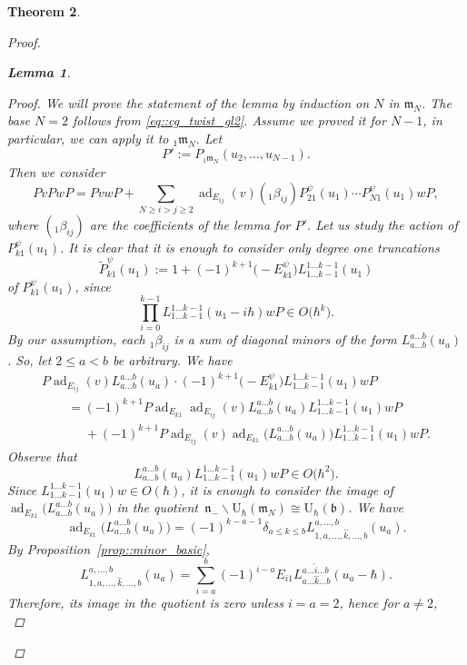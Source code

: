 \documentclass[10pt,a4paper]{article}
\numberwithin{equation}{section}
\newtheorem{Theorem}{Theorem}[section]
\newtheorem{Lemma}[Theorem]{Lemma}
\newcommand{\U}{\mathrm{U}_{\hbar}}
\renewcommand{\b}{\mathfrak{b}}
\newcommand{\n}{\mathfrak{n}}
\newcommand{\m}{\mathfrak{m}}
\DeclareMathOperator{\ad}{ad}
\begin{document}
\begin{Theorem}
\begin{proof}
\begin{Lemma}
\begin{proof}
					We will prove the statement of the lemma by induction on $N$ in $\m_N$. The base $N=2$ follows from \eqref{eq::cg_twist_gl2}. Assume we proved it for $N-1$, in particular, we can apply it to ${}_1\m_N$. Let
					\[
					P' := P_{{}_1\m_N} (u_2,\dots, u_{N-1}).
					\]
					Then we consider
					\[
					PvPwP = PvwP + \sum\limits_{N\geq i > j \geq 2} \ad_{E_{ij}}(v) ({}_1\beta_{ij}) P_{21}^{\psi}(u_1) \cdots P_{N1}^{\psi}(u_1) wP,
					\]
					where $({}_1\beta_{ij})$ are the coefficients of the lemma for $P'$. Let us study the action of $P_{k1}^{\psi}(u_1)$. It is clear that it is enough to consider only degree one truncations
					\[
					\tilde{P}_{k1}^{\psi}(u_1) := 1 + (-1)^{k+1} \bigl(-E_{k1}^{\psi}\bigr) L_{1\dots k-1}^{1\dots k-1}(u_1)
					\]
					of $P_{k1}^{\psi}(u_1)$, since
					\[
					\prod_{i=0}^{k-1} L_{1\dots k-1}^{1\dots k-1}(u_1 - i\hbar)wP \in O\bigl(\hbar^k\bigr).
					\]
					By our assumption, each ${}_1\beta_{ij}$ is a sum of diagonal minors of the form $L_{a\dots b}^{a\dots b}(u_a)$. So, let $2 \leq a < b$ be arbitrary. We have
					\begin{gather*}
						P\ad_{E_{ij}}(v) L_{a \dots b}^{a\dots b}(u_a) \cdot (-1)^{k+1} \bigl(-E_{k1}^{\psi}\bigr) L_{1\dots k-1}^{1\dots k-1}(u_1) wP \\
						\qquad= (-1)^{k+1} P \ad_{E_{k1}} \ad_{E_{ij}}(v) L_{a\dots b}^{a\dots b}(u_a) L_{1\dots k-1}^{1\dots k-1}(u_1) wP \\
						\phantom{\qquad=}{}+ (-1)^{k+1} P \ad_{E_{ij}}(v) \ad_{E_{k1}} \bigl(L_{a\dots b}^{a \dots b}(u_a)\bigr) L_{1\dots k-1}^{1\dots k-1}(u_1)wP.
					\end{gather*}
					Observe that
					\[
					L_{a\dots b}^{a\dots b}(u_a) L_{1\dots k-1}^{1\dots k-1}(u_1) wP \in O\bigl(\hbar^2\bigr).
					\]
					Since $L_{1\dots k-1}^{1\dots k-1}(u_1)w \in O(\hbar)$, it is enough to consider the image of $\ad_{E_{k1}}\bigl(L_{a\dots b}^{a\dots b}(u_a)\bigr) $ in the quotient~${\n_- \backslash \U(\m_N) \cong \U(\b)}$.
					We have
					\[
					\ad_{E_{k1}}\bigl(L_{a\dots b}^{a\dots b}(u_a)\bigr) = (-1)^{k-a-1}\delta_{a \leq k \leq b} L_{1,a,\dots,\hat{k},\dots,b}^{a,\dots,b}(u_a).
					\]
					By Proposition~\ref{prop::minor_basic},
					\[
					L_{1,a,\dots,\hat{k},\dots,b}^{a,\dots,b}(u_a) = \sum\limits_{i=a}^b (-1)^{i-a} E_{i1} L_{a\dots \hat{k} \dots b}^{a\dots \hat{i} \dots b}(u_a-\hbar).
					\]
					Therefore, its image in the quotient is zero unless $i=a=2$, hence for $a\not= 2$,
					\begin{equation}
						\label{eq::not_two_no_contribution}

\end{equation}
\end{proof}
\end{Lemma}
\end{proof}
\end{Theorem}
\end{document}
